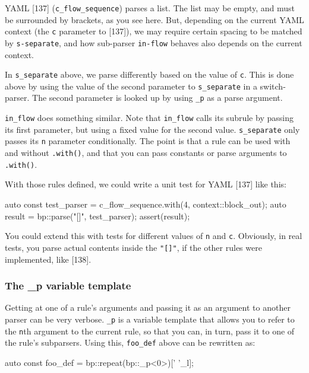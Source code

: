 YAML {[}137{]} (\texttt{c\_flow\_sequence}) parses a list. The list may be empty, and must be surrounded by brackets, as you see here. But, depending on the current YAML context (the \texttt{c} parameter to {[}137{]}), we may require certain spacing to be matched by \texttt{s-separate}, and how sub-parser \texttt{in-flow} behaves also depends on the current context.

In \texttt{s\_separate} above, we parse differently based on the value of \texttt{c}. This is done above by using the value of the second parameter to \texttt{s\_separate} in a switch-parser. The second parameter is looked up by using \texttt{\_p} as a parse argument.

\texttt{in\_flow} does something similar. Note that \texttt{in\_flow} calls its subrule by passing its first parameter, but using a fixed value for the second value. \texttt{s\_separate} only passes its \texttt{n} parameter conditionally. The point is that a rule can be used with and without \texttt{.with()}, and that you can pass constants or parse arguments to \texttt{.with()}.

With those rules defined, we could write a unit test for YAML {[}137{]} like this:

\begin{code}
auto const test_parser = c_flow_sequence.with(4, context::block_out);
auto result = bp::parse("[]", test_parser);
assert(result);
\end{code}

You could extend this with tests for different values of \texttt{n} and \texttt{c}. Obviously, in real tests, you parse actual contents inside the \texttt{"{[}{]}"}, if the other rules were implemented, like {[}138{]}.

\subsubsection{The \_p variable template}

Getting at one of a rule's arguments and passing it as an argument to another parser can be very verbose. \texttt{\_p} is a variable template that allows you to refer to the \texttt{n}th argument to the current rule, so that you can, in turn, pass it to one of the rule's subparsers. Using this, \texttt{foo\_def} above can be rewritten as:

\begin{code}
auto const foo_def = bp::repeat(bp::_p<0>)[' '_l];
\end{code}

